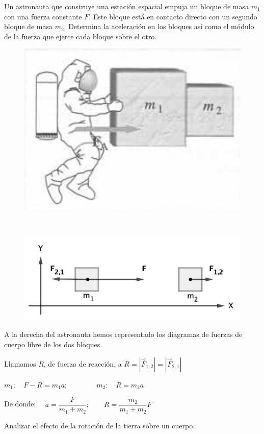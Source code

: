 \begin{prob}
Un astronauta que construye una estación espacial empuja un bloque de masa $m_1$ con una fuerza constante $F$. Este bloque está en contacto directo con un segundo bloque de masa $m_2$. Determina la aceleración en los bloques así como el módulo de la fuerza que ejerce cada bloque sobre el otro.	
\end{prob}
\begin{multicols}{2}
\begin{figure}[H]
	\centering
	\includegraphics[width=.5\textwidth]{imagenes/imagenes03/T03IM59.png}
	\end{figure}
$\quad$
\begin{figure}[H]
	\centering
	\includegraphics[width=.5\textwidth]{imagenes/imagenes03/T03IM60.png}
	\end{figure}
\end{multicols}	

A la derecha del astronauta hemos representado los diagramas de fuerzas de cuerpo libre de los dos bloques.

Llamamos $R$, de fuerza de reacción, a $R=|\vec F_{1,2}|=|\vec F_{2,1}|$

$m_1: \quad F-R=m_1 a; \qquad \qquad m_2: \quad R=m_2 a$

De donde: $\quad a=\dfrac{F}{m_1+m_2};\qquad R=\dfrac{m_2}{m_1+m_2}F$



\begin{prob}
Analizar el efecto de la rotación de la tierra sobre un cuerpo.
\end{prob}

